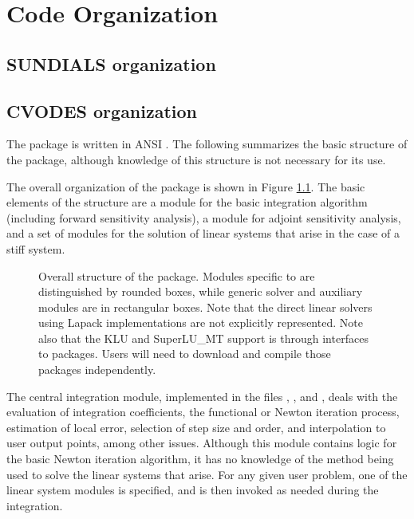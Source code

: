 \chapter{Code Organization}\label{s:organization}

\section{SUNDIALS organization}\label{ss:sun_org}


\section{CVODES organization}\label{ss:cvodes_org}

The {\cvodes} package is written in ANSI {\C}. The following
summarizes the basic structure of the package, although knowledge
of this structure is not necessary for its use.

The overall organization of the {\cvodes} package is shown in Figure
\ref{f:cvsorg}.  The basic elements of the structure are a module for
the basic integration algorithm (including forward sensitivity analysis),
a module for adjoint sensitivity analysis, and a set of modules for the solution
of linear systems that arise in the case of a stiff system.  
\begin{figure}
{\centerline{}}
\caption [Overall structure of the CVODES package]
{Overall structure of the {\cvodes} package.
  Modules specific to {\cvodes} are distinguished by rounded boxes, while 
  generic solver and auxiliary modules are in rectangular boxes. 
  Note that the direct linear solvers using Lapack implementations are not 
  explicitly represented.  Note also that the KLU and SuperLU\_MT support 
  is through interfaces
  to packages.  Users will need to download and compile those packages independently.}
\label{f:cvsorg}
\end{figure}
The central integration module, implemented in the files ,
, and , deals 
with the evaluation of integration coefficients,
the functional or Newton iteration process, estimation of local error,
selection of step size and order, and interpolation to user output
points, among other issues.  Although this module contains logic for
the basic Newton iteration algorithm, it has no knowledge of the
method being used to solve the linear systems that arise.  For any
given user problem, one of the linear system modules is specified, and
is then invoked as needed during the integration. 

